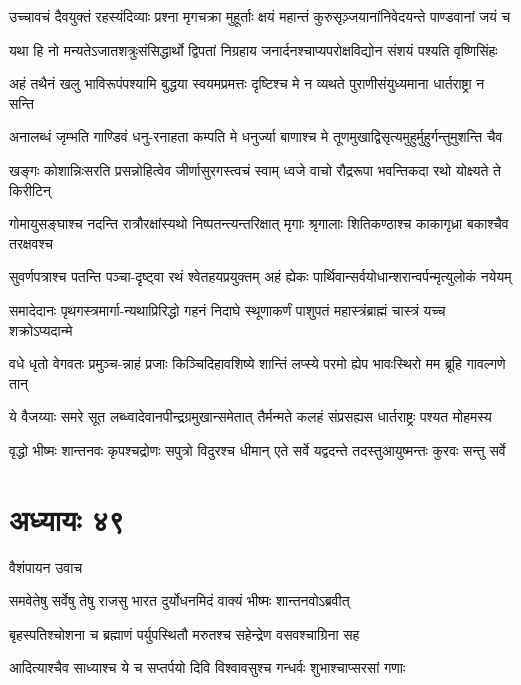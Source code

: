 \twolineshloka
{उच्चावचं दैवयुक्तं रहस्यंदिव्याः प्रश्ना मृगचक्रा मुहूर्ताः}
{क्षयं महान्तं कुरुसृञ़्जयानांनिवेदयन्ते पाण्डवानां जयं च}


\twolineshloka
{यथा हि नो मन्यतेऽजातशत्रुःसंसिद्धार्थो द्विपतां निग्रहाय}
{जनार्दनश्चाप्यपरोक्षविद्योन संशयं पश्यति वृष्णिसिंहः}


\twolineshloka
{अहं तथैनं खलु भाविरूपंपश्यामि बुद्धया स्वयमप्रमत्तः}
{दृष्टिश्च मे न व्यथते पुराणीसंयुध्यमाना धार्तराष्ट्रा न सन्ति}


\twolineshloka
{अनालब्धं जृम्भति गाण्डिवं धनु-रनाहता कम्पति मे धनुर्ज्या}
{बाणाश्च मे तूणमुखाद्विसृत्यमुहुर्मुहुर्गन्तुमुशन्ति चैव}


\twolineshloka
{खङ्गः कोशान्निःसरति प्रसन्नोहित्वेव जीर्णासुरगस्त्वचं स्वाम्}
{ध्वजे वाचो रौद्ररूपा भवन्तिकदा रथो योक्ष्यते ते किरीटिन्}


\twolineshloka
{गोमायुसङ्घाश्च नदन्ति रात्रौरक्षांस्यथो निष्पतन्त्यन्तरिक्षात्}
{मृगाः श्रृगालाः शितिकण्ठाश्च काकागृध्रा बकाश्चैव तरक्षवश्च}


\twolineshloka
{सुवर्णपत्राश्च पतन्ति पञ्चा-दृष्ट्वा रथं श्वेतहयप्रयुक्तम्}
{अहं ह्येकः पार्थिवान्सर्वयोधान्शरान्वर्पन्मृत्युलोकं नयेयम्}


\twolineshloka
{समादेदानः पृथगस्त्रमार्गा-न्यथाप्रिरिद्धो गहनं निदाघे}
{स्थूणाकर्णं पाशुपतं महास्त्रंब्राह्मं चास्त्रं यच्च शक्रोऽप्यदान्मे}


\twolineshloka
{वधे धृतो वेगवतः प्रमुञ्च-न्नाहं प्रजाः किञ्चिदिहावशिष्ये}
{शान्तिं लप्स्ये परमो ह्येप भावःस्थिरो मम ब्रूहि गावल्गणे तान्}


\twolineshloka
{ये वैजय्याः समरे सूत लब्ध्वादेवानपीन्द्रग्रमुखान्समेतात्}
{तैर्मन्मते कलहं संप्रसह्यस धार्तराष्ट्रः पश्यत मोहमस्य}


\twolineshloka
{वृद्धो भीष्मः शान्तनवः कृपश्चद्रोणः सपुत्रो विदुरश्च धीमान्}
{एते सर्वे यद्वदन्ते तदस्तुआयुष्मन्तः कुरवः सन्तु सर्वे}


\chapter{अध्यायः ४९}
\twolineshloka
{वैशंपायन उवाच}
{}


\twolineshloka
{समवेतेषु सर्वेषु तेषु राजसु भारत}
{दुर्योधनमिदं वाक्यं भीष्मः शान्तनवोऽब्रवीत्}


\twolineshloka
{बृहस्पतिश्चोशना च ब्रह्माणं पर्युपस्थितौ}
{मरुतश्च सहेन्द्रेण वसवश्चाग्रिना सह}


\twolineshloka
{आदित्याश्चैव साध्याश्च ये च सप्तर्पयो दिवि}
{विश्वावसुश्च गन्धर्वः शुभाश्चाप्सरसां गणाः}


